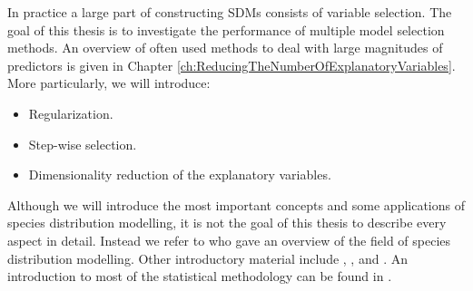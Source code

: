 In practice a large part of constructing SDMs consists of variable selection. The goal of this thesis is to investigate the performance of multiple model selection methods. An overview of often used methods to deal with large magnitudes of predictors is given in Chapter \ref{ch:ReducingTheNumberOfExplanatoryVariables}. More particularly, we will introduce: 
\begin{itemize}
\item Regularization. 
\item Step-wise selection. 
\item Dimensionality reduction of the explanatory variables. 
\end{itemize}


Although we will introduce the most important concepts and some applications of species distribution modelling, it is not the goal of this thesis to describe every aspect in detail. Instead we refer to \cite{franklin_mapping_2009} who gave an overview of the field of species distribution modelling. Other introductory material include
\cite{guisan_predictive_2000}, \cite{guisan_predicting_2005}, and \cite{elith_species_2009}. An introduction to most of the statistical methodology can be found in \cite{hastie_elements_2009}.





















